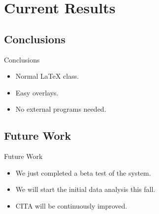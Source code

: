 \documentclass{beamer}
\begin{document}
\section{Current Results}

\subsection{Conclusions}

\begin{frame}{Conclusions}
  \begin{itemize}
    \item Normal LaTeX class.
    \item Easy overlays.
    \item No external programs needed.      
  \end{itemize}
\end{frame}

\subsection{Future Work}

\begin{frame}{Future Work}
  \begin{itemize}
  \item We just completed a beta test of the system.
  \item We will start the initial data analysis this fall.
  \item CITA will be continuously improved.
\end{itemize}
\end{frame}
\end{document}
